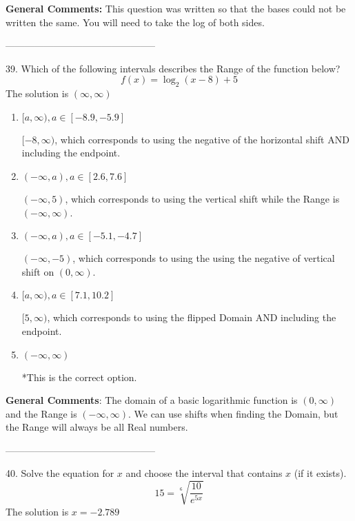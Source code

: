 \documentclass{extbook}[14pt]
\begin{document}
\textbf{General Comments:} This question was written so that the bases could not be written the same. You will need to take the log of both sides.

-----------------------------------------------

39. Which of the following intervals describes the Range of the function below?
\[ f(x) = \log_2{(x-8)}+5 \] 
The solution is $ (\infty, \infty) $ 

\begin{enumerate}[label=\Alph*.] 
\item $ [a, \infty), a \in [-8.9, -5.9] $ 

 $[-8, \infty)$, which corresponds to using the negative of the horizontal shift AND including the endpoint. 
\item $ (-\infty, a), a \in [2.6, 7.6] $ 

 $(-\infty, 5)$, which corresponds to using the vertical shift while the Range is $(-\infty, \infty)$. 
\item $ (-\infty, a), a \in [-5.1, -4.7] $ 

 $(-\infty, -5)$, which corresponds to using the using the negative of vertical shift on $(0, \infty)$. 
\item $ [a, \infty), a \in [7.1, 10.2] $ 

 $[5, \infty)$, which corresponds to using the flipped Domain AND including the endpoint. 
\item $ (-\infty, \infty) $ 

 *This is the correct option. 
\end{enumerate} 
 
\textbf{General Comments}: The domain of a basic logarithmic function is $(0, \infty)$ and the Range is $(-\infty, \infty)$. We can use shifts when finding the Domain, but the Range will always be all Real numbers.

-----------------------------------------------

40.  Solve the equation for $x$ and choose the interval that contains $x$ (if it exists).
\[  15 = \sqrt[6]{\frac{10}{e^{5x}}} \] 
The solution is $ x = -2.789 $ 
\end{document}
